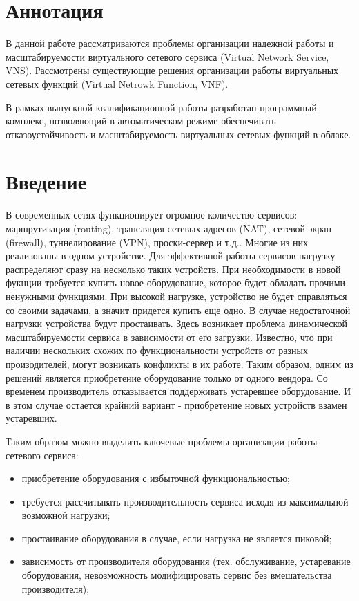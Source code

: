 \documentclass[oneside,final,14pt,a4paper]{extreport}
\begin{document}
\chapter*{Аннотация}
В данной работе рассматриваются проблемы организации надежной работы и масштабируемости виртуального сетевого сервиса (Virtual Network Service, VNS). Рассмотрены существующие решения организации работы виртуальных сетевых функций (Virtual Netrowk Function, VNF).

В рамках выпускной квалификационной работы разработан программный комплекс, позволяющий в автоматическом режиме обеспечивать отказоустойчивость и масштабируемость виртуальных сетевых функций в облаке.





\tableofcontents %





\chapter*{Введение}

В современных сетях функционирует огромное количество сервисов: маршрутизация (routing), трансляция сетевых адресов (NAT), сетевой экран (firewall), туннелирование (VPN), проски-сервер и т.д.. Многие из них реализованы в одном устройстве. Для эффективной работы сервисов нагрузку распределяют сразу на несколько таких устройств. При необходимости в новой фукнции требуется купить новое оборудование, которое будет обладать прочими ненужными функциями. При высокой нагрузке, устройство не будет справляться со своими задачами, а значит придется купить еще одно. В случае недостаточной нагрузки устройства будут простаивать. Здесь возникает проблема динамической масштабируемости сервиса в зависимости от его загрузки. Известно, что при наличии нескольких схожих по функциональности устройств от разных произодителей, могут возникать конфликты в их работе. Таким образом, одним из решений является приобретение оборудование только от одного вендора. Со временем производитель отказывается поддерживать устаревшее оборудование. И в этом случае остается крайний вариант - приобретение новых устройств взамен устаревших.

Таким образом можно выделить ключевые проблемы организации работы сетевого сервиса:
\begin{itemize}
	\item приобретение оборудования с избыточной функциональностью;
	\item требуется рассчитывать производительность сервиса исходя из максимальной возможной нагрузки;
	\item простаивание оборудования в случае, если нагрузка не является пиковой;
	\item зависимость от производителя оборудования (тех. обслуживание, устаревание оборудования, невозможность модифицировать сервис без вмешательства производителя);
\end{itemize}
\end{document}
